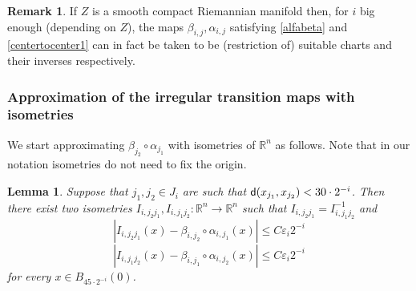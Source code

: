 \documentclass[11pt]{article}
\newcommand{\eps}{\varepsilon}
\newcommand{\rr}{\mathbb{R}}
\newcommand{\sfd}{{\sf d}}
\theoremstyle{plain}
\newtheorem{lemma}[theorem]{Lemma}
\theoremstyle{definition}
\newtheorem{remark}[theorem]{Remark}
\numberwithin{equation}{section}
\begin{document}
\begin{remark}\label{rmk:charts}
    If $Z$ is a smooth compact Riemannian manifold then, for $i$ big enough (depending on $Z$), the maps $\beta_{i,j}, \alpha_{i,j}$ satisfying \eqref{alfabeta} and \eqref{centertocenter1}  can in fact be taken to be (restriction of)  suitable charts and their inverses respectively. 
\end{remark}



\subsubsection{Approximation of the irregular transition maps with isometries}
We start approximating  $\beta_{j_2} \circ \alpha_{j_1}$ with isometries of $\rr^n$ as follows. Note that in our notation isometries do not need to fix the origin.
\begin{lemma}\label{Definition of the transition maps}
	 Suppose  that $j_1,j_2 \in J_i$ are such that $\sfd(x_{j_1},x_{j_2})<30\cdot 2^{-i}$. Then there exist two isometries 
	$I_{i,j_2j_1},I_{i,j_1j_2}: \rr^n \to \rr^n$ such that $I_{i,j_2j_1}=I_{i,j_1j_2}^{-1}$ and
	\begin{equation}\label{alminverse}
		|I_{i,j_2j_1}(x)-\beta_{i,j_2} \circ \alpha_{i,j_1}(x) |\le C\eps_i 2^{-i}
	\end{equation}
	\begin{equation}\label{alminverseother}
		|I_{i,j_1j_2}(x)-\beta_{i,j_1} \circ \alpha_{i,j_2}(x) |\le C\eps_i 2^{-i}
	\end{equation}
	for every $x \in B_{45\cdot2^{-i}}(0)$.
\end{lemma}
\end{document}
